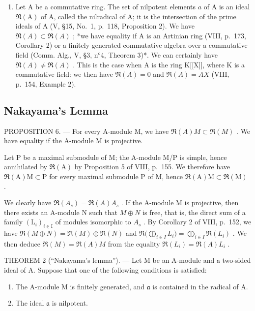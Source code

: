 \begin{enumerate}
\def\labelenumi{\arabic{enumi})}
\setcounter{enumi}{1}
\tightlist
\item
  Let A be a commutative ring. The set of nilpotent elements \(a\) of A is an ideal \(\mathfrak{N}(\mathrm{A})\) of A, called the nilradical of A; it is the intersection of the prime ideals of A (V, §15, No.~1, p.~118, Proposition 2). We have \(\mathfrak{N}(A) \subset \mathfrak{R}(A)\) ; *we have equality if A is an Artinian ring (VIII, p.~173, Corollary 2) or a finitely generated commutative algebra over a commutative field (Comm. Alg., V, §3, n°4, Theorem 3)*. We can certainly have \(\mathfrak{N}(A) \neq \mathfrak{R}(A)\) . This is the case when A is the ring K{[}{[}X{]}{]}, where K is a commutative field: we then have \(\mathfrak{N}(A) = 0\) and \(\mathfrak{R}(A) = AX\) (VIII, p.~154, Example 2).
\end{enumerate}

\subsection{Nakayama's Lemma}

PROPOSITION 6. --- For every A-module M, we have \(\Re(A)M \subset \Re(M)\) . We have equality if the A-module M is projective.

Let P be a maximal submodule of M; the A-module M/P is simple, hence annihilated by \(\Re(\mathrm{A})\) by Proposition 5 of VIII, p.~155. We therefore have \(\Re(\mathrm{A})\mathrm{M}\subset\mathrm{P}\) for every maximal submodule P of M, hence \(\Re(\mathrm{A})\mathrm{M}\subset\Re(\mathrm{M})\) .

We clearly have \(\mathfrak{R}(A_{s})=\mathfrak{R}(A)A_{s}\) . If the A-module M is projective, then there exists an A-module N such that \(M\oplus N\) is free, that is, the direct sum of a family \((\mathrm{L}_{i})_{i\in\mathrm{I}}\) of modules isomorphic to \(A_{s}\) . By Corollary 2 of VIII, p.~152, we have \(\mathfrak{R}(M\oplus N)=\mathfrak{R}(M)\oplus\mathfrak{R}(N)\) and \(\mathfrak{R}\big(\bigoplus_{i\in I}L_{i}\big)=\bigoplus_{i\in I}\mathfrak{R}(L_{i})\) . We then deduce \(\mathfrak{R}(M)=\mathfrak{R}(A)M\) from the equality \(\mathfrak{R}(L_{i})=\mathfrak{R}(A)L_{i}\) .

THEOREM 2 (``Nakayama's lemma''). --- Let M be an A-module and a two-sided ideal of A. Suppose that one of the following conditions is satisfied:

\begin{enumerate}
\def\labelenumi{(\roman{enumi})}
\item
  The A-module M is finitely generated, and \(\mathfrak{a}\) is contained in the radical of A.
\item
  The ideal \(\mathfrak{a}\) is nilpotent.
\end{enumerate}

